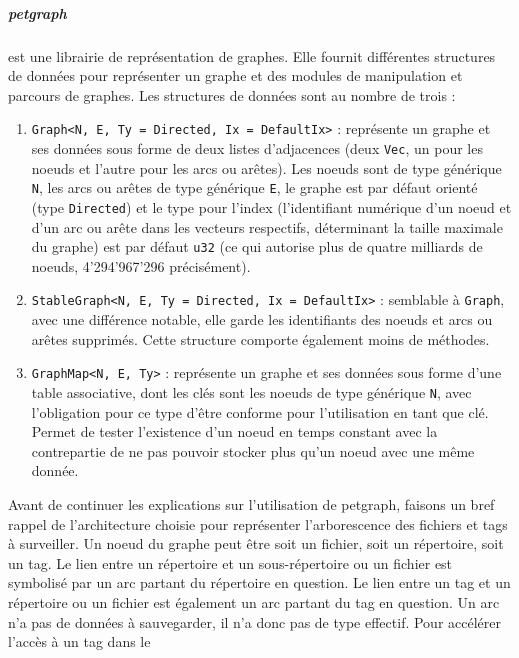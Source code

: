 \subparagraph{petgraph}\label{tag_engine_petgraph}
est une librairie de représentation de graphes. Elle fournit différentes structures de données pour 
représenter un graphe et des modules de manipulation et parcours de graphes. Les structures de 
données sont au nombre de trois :
\begin{enumerate}
    \item \texttt{Graph<N, E, Ty = Directed, Ix = DefaultIx>} : représente un graphe et 
        ses données sous forme de deux listes d'adjacences (deux \texttt{Vec}, un pour les 
        noeuds et l'autre pour les arcs ou arêtes). Les noeuds sont de type générique \texttt{N}, 
        les arcs ou arêtes de type générique \texttt{E}, le graphe est par défaut orienté (type 
        \texttt{Directed}) et le type pour l'index (l'identifiant numérique d'un noeud et 
        d'un arc ou arête dans les vecteurs respectifs, déterminant la taille maximale du graphe) 
        est par défaut \texttt{u32} (ce qui autorise plus de quatre milliards de noeuds, 
        4'294'967'296 précisément).
    \item \texttt{StableGraph<N, E, Ty = Directed, Ix = DefaultIx>} : semblable à 
        \texttt{Graph}, avec une différence notable, elle garde les identifiants des noeuds et 
        arcs ou arêtes supprimés. Cette structure comporte également moins de méthodes.
    \item \texttt{GraphMap<N, E, Ty>} : représente un graphe et ses données sous forme 
        d'une table associative, dont les clés sont les noeuds de type générique \texttt{N}, 
        avec l'obligation pour ce type d'être conforme pour l'utilisation en tant que clé. Permet 
        de tester l'existence d'un noeud en temps constant avec la contrepartie de ne pas pouvoir 
        stocker plus qu'un noeud avec une même donnée.
\end{enumerate}
Avant de continuer les explications sur l'utilisation de petgraph, faisons un bref rappel de l'architecture 
choisie pour représenter l'arborescence des fichiers et tags à surveiller. Un noeud du graphe peut 
être soit un fichier, soit un répertoire, soit un tag. Le lien entre un répertoire et un sous-répertoire 
ou un fichier est symbolisé par un arc partant du répertoire en question. Le lien entre un tag et 
un répertoire ou un fichier est également un arc partant du tag en question. Un arc n'a pas de 
données à sauvegarder, il n'a donc pas de type effectif. Pour accélérer l'accès à un tag dans le 
